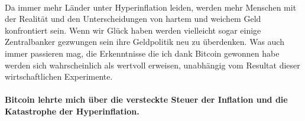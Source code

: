 \paragraph{}
Da immer mehr Länder unter Hyperinflation leiden, werden mehr Menschen mit der
Realität und den Unterscheidungen von hartem und weichem Geld konfrontiert sein.
Wenn wir Glück haben werden vielleicht sogar einige Zentralbanker gezwungen sein
ihre Geldpolitik neu zu überdenken. Was auch immer passieren mag, die
Erkenntnisse die ich dank Bitcoin gewonnen habe werden sich wahrscheinlich als
wertvoll erweisen, unabhängig vom Resultat dieser wirtschaftlichen Experimente.

\paragraph{Bitcoin lehrte mich über die versteckte Steuer der Inflation und die
Katastrophe der Hyperinflation.}

%
%
%
%
%
